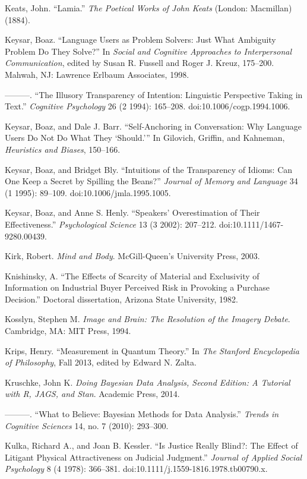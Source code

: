 \documentclass[letterpaper]{book}
\begin{document}
{
 Keats, John. ``Lamia.''
\textit{The Poetical Works of John Keats} (London: Macmillan) (1884).}

{
 Keysar, Boaz. ``Language Users as Problem
Solvers: Just What Ambiguity Problem Do They Solve?''
In \textit{Social and Cognitive Approaches to Interpersonal
Communication}, edited by Susan R. Fussell and Roger J. Kreuz,
175--200. Mahwah, NJ: Lawrence Erlbaum Associates, 1998.}

{
 {}---{}---{}---. ``The Illusory Transparency of
Intention: Linguistic Perspective Taking in Text.''
\textit{Cognitive Psychology} 26 (2 1994): 165--208.
doi:10.1006/cogp.1994.1006.}

{
 Keysar, Boaz, and Dale J. Barr. ``Self-Anchoring
in Conversation: Why Language Users Do Not Do What They
`Should.''' In
Gilovich, Griffin, and Kahneman, \textit{Heuristics and Biases},
150--166.}

{
 Keysar, Boaz, and Bridget Bly. ``Intuitions of
the Transparency of Idioms: Can One Keep a Secret by Spilling the
Beans?'' \textit{Journal of Memory and Language} 34
(1 1995): 89--109. doi:10.1006/jmla.1995.1005.}

{
 Keysar, Boaz, and Anne S. Henly.
``Speakers' Overestimation of Their
Effectiveness.'' \textit{Psychological Science} 13 (3
2002): 207--212. doi:10.1111/1467-9280.00439.}

{
 Kirk, Robert. \textit{Mind and Body}.
McGill-Queen's University Press, 2003.}

{
 Knishinsky, A. ``The Effects of Scarcity of
Material and Exclusivity of Information on Industrial Buyer Perceived
Risk in Provoking a Purchase Decision.'' Doctoral
dissertation, Arizona State University, 1982.}

{
 Kosslyn, Stephen M. \textit{Image and Brain: The Resolution of the
Imagery Debate}. Cambridge, MA: MIT Press, 1994.}

{
 Krips, Henry. ``Measurement in Quantum
Theory.'' In \textit{The Stanford Encyclopedia of
Philosophy}, Fall 2013, edited by Edward N. Zalta.}

{
 Kruschke, John K. \textit{Doing Bayesian Data Analysis, Second
Edition: A Tutorial with R, JAGS, and Stan}. Academic Press, 2014.}

{
 {}---{}---{}---. ``What to Believe: Bayesian
Methods for Data Analysis.'' \textit{Trends in
Cognitive Sciences} 14, no. 7 (2010): 293--300.}

{
 Kulka, Richard A., and Joan B. Kessler. ``Is
Justice Really Blind?: The Effect of Litigant Physical Attractiveness
on Judicial Judgment.'' \textit{Journal of Applied
Social Psychology} 8 (4 1978): 366--381.
doi:10.1111/j.1559-1816.1978.tb00790.x.}
\end{document}
